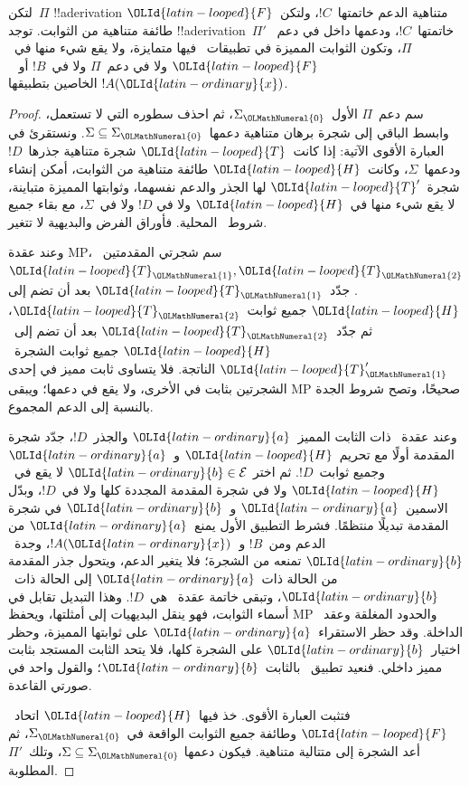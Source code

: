 \documentclass[../../../include/open-logic-section]{subfiles}
\begin{document}
\begin{lem}
لتكن~$\Pi$ !!a{derivation} متناهية الدعم خاتمتها~$!C$، ولتكن~$\OLId{latin-looped}{F}$
طائفة متناهية من الثوابت. توجد !!a{derivation}~$\Pi'$ خاتمتها~$!C$،
ودعمها داخل في دعم~$\Pi$، وتكون الثوابت المميزة في تطبيقات~\QR{} فيها
متمايزة، ولا يقع شيء منها في~$\OLId{latin-looped}{F}$ ولا في دعم~$\Pi$ ولا في~$!B$ أو
~$!A(\OLId{latin-ordinary}{x})$ الخاصين بتطبيقها.
\end{lem}

\begin{proof}
سم دعم~$\Pi$ الأول~$\Sigma_\OLMathNumeral{0}$، ثم احذف سطوره التي لا تستعمل، وابسط
الباقي إلى شجرة برهان متناهية دعمها~$\Sigma\subseteq\Sigma_\OLMathNumeral{0}$.
ونستقرئ في العبارة الأقوى الآتية: إذا كانت~$\OLId{latin-looped}{T}$ شجرة متناهية جذرها~$!D$
ودعمها~$\Sigma$، وكانت~$\OLId{latin-looped}{H}$ طائفة متناهية من الثوابت، أمكن إنشاء
شجرة~$\OLId{latin-looped}{T}'$ لها الجذر والدعم نفسهما، وثوابتها المميزة متباينة، لا يقع شيء منها في~$\OLId{latin-looped}{H}$ ولا في
$!D$ ولا في~$\Sigma$، مع بقاء جميع شروط~\QR{} المحلية. فأوراق الفرض
والبديهية لا تتغير.

وعند عقدة MP، سم شجرتي المقدمتين~$\OLId{latin-looped}{T}_\OLMathNumeral{1},\OLId{latin-looped}{T}_\OLMathNumeral{2}$. جدّد~$\OLId{latin-looped}{T}_\OLMathNumeral{1}$ بعد أن تضم إلى
$\OLId{latin-looped}{H}$ جميع ثوابت~$\OLId{latin-looped}{T}_\OLMathNumeral{2}$، ثم جدّد~$\OLId{latin-looped}{T}_\OLMathNumeral{2}$ بعد أن تضم إلى~$\OLId{latin-looped}{H}$ جميع ثوابت
الشجرة~$\OLId{latin-looped}{T}'_\OLMathNumeral{1}$ الناتجة. فلا يتساوى ثابت مميز في إحدى الشجرتين بثابت في الأخرى،
ولا يقع في دعمها؛ ويبقى MP صحيحًا، وتصح شروط الجدة بالنسبة إلى الدعم
المجموع.

وعند عقدة~\QR{} ذات الثابت المميز~$\OLId{latin-ordinary}{a}$ والجذر~$!D$، جدّد شجرة المقدمة
أولًا مع تحريم~$\OLId{latin-looped}{H}$ و~$\OLId{latin-ordinary}{a}$ وجميع ثوابت~$!D$. ثم اختر
$\OLId{latin-ordinary}{b}\in\mathcal E$ لا يقع في~$\OLId{latin-looped}{H}$ ولا في شجرة المقدمة المجددة كلها ولا
في~$!D$، وبدّل الاسمين~$\OLId{latin-ordinary}{a}$ و~$\OLId{latin-ordinary}{b}$ في شجرة المقدمة تبديلًا منتظمًا.
فشرط التطبيق الأول يمنع~$\OLId{latin-ordinary}{a}$ من الدعم ومن~$!B$ و~$!A(\OLId{latin-ordinary}{x})$، وجدة~$\OLId{latin-ordinary}{b}$
تمنعه من الشجرة؛ فلا يتغير الدعم، ويتحول جذر المقدمة من الحالة ذات~$\OLId{latin-ordinary}{a}$
إلى الحالة ذات~$\OLId{latin-ordinary}{b}$، وتبقى خاتمة عقدة~\QR{} هي~$!D$. وهذا التبديل
تقابل في أسماء الثوابت، فهو ينقل البديهيات إلى أمثلتها، ويحفظ MP والحدود
المغلقة وعقد~\QR{} الداخلة. وقد حظر الاستقراء~$\OLId{latin-ordinary}{a}$ على ثوابتها المميزة،
وحظر اختيار~$\OLId{latin-ordinary}{b}$ على الشجرة كلها، فلا يتحد الثابت المستجد بثابت مميز داخلي.
فنعيد تطبيق~\QR{} بالثابت~$\OLId{latin-ordinary}{b}$؛ والقول واحد في صورتي القاعدة.

فتثبت العبارة الأقوى. خذ فيها~$\OLId{latin-looped}{H}$ اتحاد~$\OLId{latin-looped}{F}$ وطائفة جميع الثوابت الواقعة
في~$\Sigma_\OLMathNumeral{0}$، ثم أعد الشجرة إلى متتالية متناهية. فيكون دعمها
$\Sigma\subseteq\Sigma_\OLMathNumeral{0}$، وتلك~$\Pi'$ المطلوبة.
\end{proof}
\end{document}
